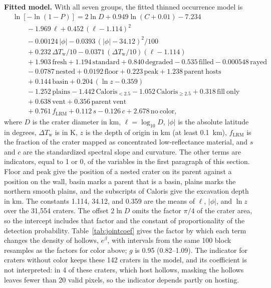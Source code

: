 \documentclass{planetary}
\begin{document}
\textbf{Fitted model.} With all seven groups, the fitted thinned occurrence model is
\begin{align}
& \ln[-\ln(1 - P)] = 2\ln D + 0.949\ln(C + 0.01) - 7.234 \nonumber\\
& \qquad - 1.969\,\ell + 0.452\,(\ell - 1.114)^2 \nonumber\\
& \qquad - 0.00124\,|\phi| - 0.0393\,(|\phi| - 34.12)^2/100 \nonumber\\
& \qquad + 0.232\,\Delta T_\mathrm{w}/10 - 0.0371\,(\Delta T_\mathrm{w}/10)(\ell - 1.114) \nonumber\\
& \qquad + 1.903\,\mathrm{fresh} + 1.194\,\mathrm{standard} + 0.840\,\mathrm{degraded} - 0.535\,\mathrm{filled} - 0.000548\,\mathrm{rayed} \nonumber\\
& \qquad - 0.0787\,\mathrm{nested} + 0.0192\,\mathrm{floor} + 0.223\,\mathrm{peak} + 1.238\,\mathrm{parent\ hosts} \nonumber\\
& \qquad + 0.144\,\mathrm{basin} + 0.204\,(\ln z - 0.359) \nonumber\\
& \qquad - 1.252\,\mathrm{plains} - 1.442\,\mathrm{Caloris}_{<2.5} - 1.052\,\mathrm{Caloris}_{\geq 2.5} + 0.318\,\mathrm{fill\ only} \nonumber\\
& \qquad + 0.638\,\mathrm{vent} + 0.356\,\mathrm{parent\ vent} \nonumber\\
& \qquad + 0.761\,f_\mathrm{LRM} + 0.112\,s - 0.126\,c + 2.678\,\mathrm{no\ color}, \label{eq:jointS}
\end{align}
where $D$ is the crater diameter in km, $\ell = \log_{10} D$, $|\phi|$ is the absolute latitude in degrees, $\Delta T_\mathrm{w}$ is in K, $z$ is the depth of origin in km (at least 0.1~km), $f_\mathrm{LRM}$ is the fraction of the crater mapped as concentrated low-reflectance material, and $s$ and $c$ are the standardized spectral slope and curvature. The other terms are indicators, equal to 1 or 0, of the variables in the first paragraph of this section. Floor and peak give the position of a nested crater on its parent against a position on the wall, basin marks a parent that is a basin, plains marks the northern smooth plains, and the subscripts of Caloris give the excavation depth in km. The constants 1.114, 34.12, and 0.359 are the means of $\ell$, $|\phi|$, and $\ln z$ over the 31,554 craters. The offset $2\ln D$ omits the factor $\pi/4$ of the crater area, so the intercept includes that factor and the constant of proportionality of the detection probability. Table~\ref{tab:jointcoef} gives the factor by which each term changes the density of hollows, $e^{\beta}$, with intervals from the same 100 block resamples as the factors for color above; $g$ is 0.95 (0.82--1.09). The indicator for craters without color keeps these 142 craters in the model, and its coefficient is not interpreted: in 4 of these craters, which host hollows, masking the hollows leaves fewer than 20 valid pixels, so the indicator depends partly on hosting.
\end{document}
